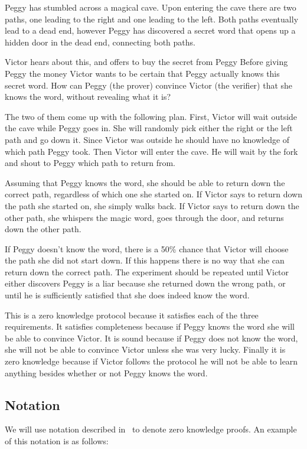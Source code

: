\documentclass{sig-alternate}
\begin{document}
	Peggy has stumbled across a magical cave. Upon entering the cave
	there are two paths, one leading to the right and one leading to the
	left. Both paths eventually lead to a dead end, however Peggy has
	discovered a secret word that opens up a hidden door in the dead end,
	connecting both paths.

	Victor hears about this, and offers to buy the secret from Peggy
	Before giving Peggy the money Victor
	wants to be certain that Peggy actually knows this secret word. How can
	Peggy (the prover) convince Victor (the verifier) that she knows the
	word, without revealing what it is?

	The two of them come up with the following plan. First, Victor will wait
	outside the cave while Peggy goes in. She will randomly pick either the
	right or the left path and go down it. Since Victor was outside he
	should have no knowledge of which path Peggy took. Then Victor will
	enter the cave. He will wait by the fork and shout to Peggy which
	path to return from. 
	
	Assuming that Peggy knows the word, she should be able to return down
	the correct path, regardless of which one she started on. If Victor 
	says to	return down the path she started on, she simply walks back. 
	If Victor says to return down the other path, she whispers the magic
	word, goes through the door, and returns down the other path.

	If Peggy doesn't know the word, there is a 50\% chance that Victor
	will choose the path she did not start down. If this happens there is
	no way that she can return down the correct path. The experiment should
	be repeated until Victor either discovers Peggy is a liar because she
	returned down the wrong path, or until he is sufficiently satisfied
	that she does indeed know the word.

	This is a zero knowledge protocol because it satisfies each of the three
	requirements. It satisfies completeness because	if Peggy knows the word
	she will be able to convince Victor. It is sound because if Peggy does not 
	know the word, she will not be able to convince Victor unless she was very
	lucky. Finally it is zero knowledge because if Victor follows the protocol
	he will not be able to learn anything besides whether or not Peggy knows 
	the word.
	
	\subsection{Notation}
	We will use notation described in~\cite{Sigma:2009} to denote zero knowledge
	proofs. An example of this notation is as follows:
	
\end{document}
